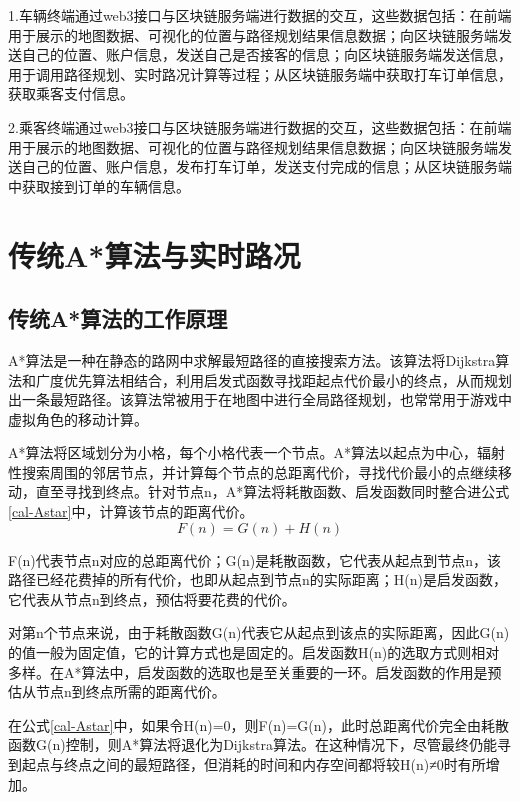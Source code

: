 1.车辆终端通过web3接口与区块链服务端进行数据的交互，这些数据包括：在前端用于展示的地图数据、可视化的位置与路径规划结果信息数据；向区块链服务端发送自己的位置、账户信息，发送自己是否接客的信息；向区块链服务端发送信息，用于调用路径规划、实时路况计算等过程；从区块链服务端中获取打车订单信息，获取乘客支付信息。

2.乘客终端通过web3接口与区块链服务端进行数据的交互，这些数据包括：在前端用于展示的地图数据、可视化的位置与路径规划结果信息数据；向区块链服务端发送自己的位置、账户信息，发布打车订单，发送支付完成的信息；从区块链服务端中获取接到订单的车辆信息。

\section{传统A*算法与实时路况}

\subsection{传统A*算法的工作原理}
\label{A*Reason}

A*算法是一种在静态的路网中求解最短路径的直接搜索方法。该算法将Dijkstra算法和广度优先算法相结合，利用启发式函数寻找距起点代价最小的终点，从而规划出一条最短路径。该算法常被用于在地图中进行全局路径规划，也常常用于游戏中虚拟角色的移动计算。

A*算法将区域划分为小格，每个小格代表一个节点。A*算法以起点为中心，辐射性搜索周围的邻居节点，并计算每个节点的总距离代价，寻找代价最小的点继续移动，直至寻找到终点。针对节点n，A*算法将耗散函数、启发函数同时整合进公式\ref{cal-Astar}中，计算该节点的距离代价。
\begin{equation}
    F(n)=G(n)+H(n)
\label{cal-Astar}
\end{equation}

F(n)代表节点n对应的总距离代价；G(n)是耗散函数，它代表从起点到节点n，该路径已经花费掉的所有代价，也即从起点到节点n的实际距离；H(n)是启发函数，它代表从节点n到终点，预估将要花费的代价。

对第n个节点来说，由于耗散函数G(n)代表它从起点到该点的实际距离，因此G(n)的值一般为固定值，它的计算方式也是固定的。启发函数H(n)的选取方式则相对多样。在A*算法中，启发函数的选取也是至关重要的一环。启发函数的作用是预估从节点n到终点所需的距离代价。

在公式\ref{cal-Astar}中，如果令H(n)=0，则F(n)=G(n)，此时总距离代价完全由耗散函数G(n)控制，则A*算法将退化为Dijkstra算法。在这种情况下，尽管最终仍能寻到起点与终点之间的最短路径，但消耗的时间和内存空间都将较H(n)≠0时有所增加。

